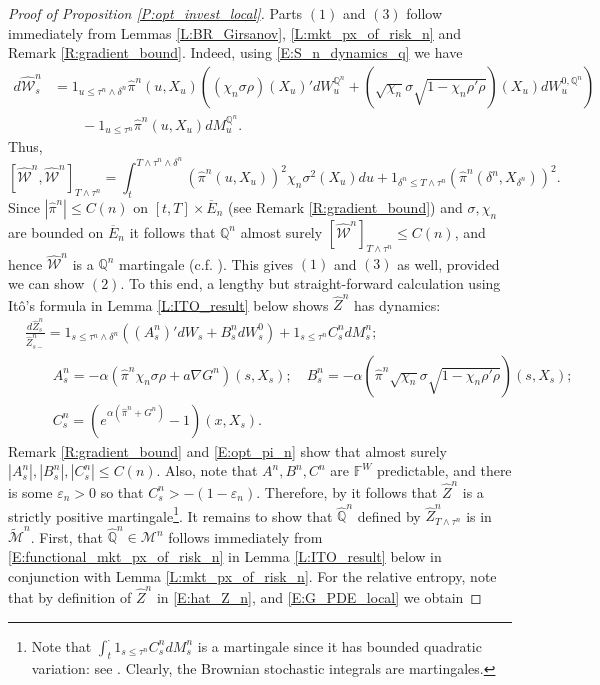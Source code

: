 \documentclass[11pt, letterpaper]{amsart}
\theoremstyle{definition}
\theoremstyle{remark}
\numberwithin{equation}{section}
\newcommand{\eps}{\varepsilon}
\newcommand{\We}{\mathcal{W}}
\newcommand{\hwe}{\hat{\We}}
\newcommand{\hz}{\hat{Z}}
\newcommand{\hqprob}{\hat{\qprob}}
\newcommand{\hpi}{\hat{\pi}}
\newcommand{\qprob}{\mathbb{Q}}
\newcommand{\M}{\mathcal{M}}
\newcommand{\tM}{\widetilde{\mathcal{M}}}
\newcommand{\filt}{\mathbb{F}}
\newcommand{\ol}[1]{\overline{#1}}
\newcommand{\ito}{It\^{o}}
\begin{document}
\begin{proof}[Proof of Proposition \ref{P:opt_invest_local}]
Parts $(1)$ and $(3)$ follow immediately from Lemmas \ref{L:BR_Girsanov}, \ref{L:mkt_px_of_risk_n} and Remark \ref{R:gradient_bound}.  Indeed, using \eqref{E:S_n_dynamics_q} we have
\begin{equation*}
\begin{split}
d\hwe^n_s &= 1_{u\leq \tau^n\wedge\delta^n}\hpi^n(u,X_u)\left(\left(\chi_n\sigma\rho\right)(X_u)'dW^{\qprob^n}_u + \left(\sqrt{\chi_n}\sigma\sqrt{1-\chi_n\rho'\rho}\right)(X_u)dW^{0,\qprob^n}_u\right)\\
&\qquad  - 1_{u\leq\tau^n}\hpi^n(u,X_u)dM^{\qprob^n}_u.
\end{split}
\end{equation*}
Thus,
\begin{equation*}
\left[\hwe^n, \hwe^n\right]_{T\wedge\tau^n} = \int_t^{T\wedge\tau^n\wedge\delta^n}\left(\hpi^n(u,X_u)\right)^2 \chi_n\sigma^2(X_u)du + 1_{\delta^n\leq T\wedge\tau^n}\left(\hpi^n(\delta^n,X_{\delta^n})\right)^2.
\end{equation*}
Since $|\hpi^n|\leq C(n)$ on $[t,T]\times \ol{E}_n$ (see Remark \ref{R:gradient_bound}) and $\sigma,\chi_n$ are bounded on $\ol{E}_n$ it follows that $\qprob^n$ almost surely $[\hwe^n]_{T\wedge\tau^n} \leq C(n)$, and hence $\hwe^n$ is a $\qprob^n$ martingale (c.f. \cite[Theorems 1.51,4.48]{MR2273672}).  This gives $(1)$ and $(3)$ as well, provided we can show $(2)$. To this end, a lengthy but straight-forward calculation using \ito's formula in Lemma \ref{L:ITO_result} below shows $\hz^n$ has dynamics:
\begin{equation}\label{E:Z_n_form}
\begin{split}
&\frac{d\hz^n_s}{\hz^n_{s-}} = 1_{s\leq\tau^n\wedge\delta^n}\left((A^n_s)'dW_s + B^n_s dW^0_s\right) + 1_{s\leq \tau^n}C^n_s dM^n_s;\\
&\qquad A^n_s = -\alpha \left(\hpi^n\chi_n\sigma \rho + a\nabla G^n\right)(s,X_s);\quad B^n_s = -\alpha \left(\hpi^n\sqrt{\chi_n}\sigma\sqrt{1-\chi_n\rho'\rho}\right)(s,X_s);\\
&\qquad C^n_s = \left(e^{\alpha\left(\hpi^n + G^n\right)}-1\right)(x,X_s).
\end{split}
\end{equation}
Remark \ref{R:gradient_bound} and \eqref{E:opt_pi_n} show that almost surely $|A^n_s|, |B^n_s|, |C^n_s|\leq C(n)$. Also, note that $A^n, B^n, C^n$ are $\filt^W$ predictable, and there is some $\eps_n>0$ so that $C^n_s > -(1-\eps_n)$. Therefore, by \cite[Theorem 9]{MR2574236} it follows that $\hz^n$ is a strictly positive martingale\footnote{Note that $\int_t^\cdot1_{s\leq \tau^n}C^n_s dM^n_s$ is a martingale since it has bounded quadratic variation: see \cite[Theorems 1.51 and 4.48]{MR2273672}. Clearly, the Brownian stochastic integrals are martingales.}. It remains to show that $\hqprob^n$ defined by $\hz^n_{T\wedge\tau^n}$ is in $\tM^n$. First, that $\hqprob^n\in\M^n$ follows immediately from \eqref{E:functional_mkt_px_of_risk_n} in Lemma \ref{L:ITO_result} below in conjunction with Lemma \ref{L:mkt_px_of_risk_n}. For the relative entropy, note that by definition of $\hz^n$ in \eqref{E:hat_Z_n}, and \eqref{E:G_PDE_local} we obtain

\end{proof}
\end{document}
